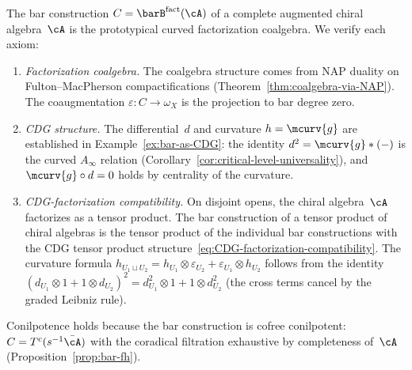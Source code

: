\begin{example}
\label{ex:bar-fact-CDG}
The bar construction
$C = \barB^{\mathrm{fact}}(\cA)$ of a complete augmented chiral
algebra~$\cA$ is the prototypical curved factorization coalgebra.
We verify each axiom:
\begin{enumerate}[label=\textup{(\roman*)}]
\item \emph{Factorization coalgebra.}
  The coalgebra structure comes from NAP duality on
  Fulton--MacPherson compactifications
  (Theorem~\ref{thm:coalgebra-via-NAP}).  The coaugmentation
  $\varepsilon \colon C \to \omega_X$ is the projection to bar
  degree zero.
\item \emph{CDG structure.}
  The differential~$d$ and curvature
  $h = \mcurv{g}$ are established in
  Example~\ref{ex:bar-as-CDG}: the identity
  $d^2 = \mcurv{g} \ast (-)$ is the curved $A_\infty$ relation
  (Corollary~\ref{cor:critical-level-universality}), and
  $\mcurv{g} \circ d = 0$ holds by centrality of the curvature.
\item \emph{CDG-factorization compatibility.}
  On disjoint opens, the chiral algebra~$\cA$ factorizes as a
  tensor product.  The bar construction of a tensor product of
  chiral algebras is the tensor product of the individual bar
  constructions with the CDG tensor product
  structure~\eqref{eq:CDG-factorization-compatibility}.  The
  curvature formula
  $h_{U_1 \sqcup U_2} = h_{U_1} \otimes \varepsilon_{U_2}
  + \varepsilon_{U_1} \otimes h_{U_2}$
  follows from the identity
  $(d_{U_1} \otimes 1 + 1 \otimes d_{U_2})^2
  = d_{U_1}^2 \otimes 1 + 1 \otimes d_{U_2}^2$
  (the cross terms cancel by the graded Leibniz rule).
\end{enumerate}
Conilpotence holds because the bar construction is cofree
conilpotent: $C = T^c(s^{-1}\bar{\cA})$ with the coradical
filtration exhaustive by completeness of~$\cA$
(Proposition~\ref{prop:bar-fh}).
\end{example}

